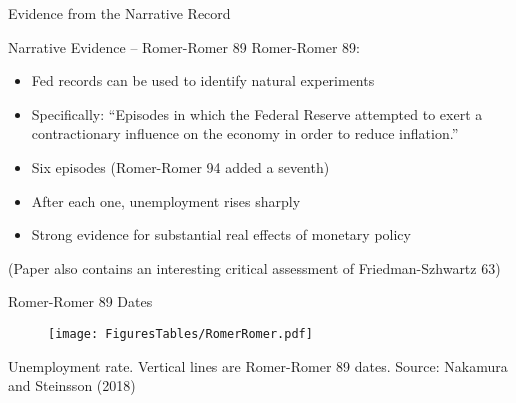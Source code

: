 \documentclass[11pt,aspectratio=169,xcolor={dvipsnames},hyperref={pdftex,pdfpagemode=UseNone,hidelinks,pdfdisplaydoctitle=true},usepdftitle=false]{beamer}
\begin{document}
{  
	\begin{frame}
		\addtocounter{framenumber}{-1}
		\thispagestyle{empty}
		
		\begin{center}
			{\Large Evidence from the Narrative Record}
		\end{center}
		
	\end{frame}
}

\begin{frame}{Narrative Evidence -- Romer-Romer 89}
Romer-Romer 89:
\begin{itemize}
\item Fed records can be used to identify natural experiments
\item Specifically: ``Episodes in which the Federal Reserve attempted to exert a contractionary influence on the economy in order to reduce inflation.''
\item Six episodes (Romer-Romer 94 added a seventh)
\item After each one, unemployment rises sharply
\item Strong evidence for substantial real effects of monetary policy
\end{itemize}

\vspace{20pt}
{\footnotesize (Paper also contains an interesting critical assessment of Friedman-Szhwartz 63)}
\end{frame}


\begin{frame}{Romer-Romer 89 Dates}
\begin{figure}
\centering
\texttt{[image: FiguresTables/RomerRomer.pdf]}
\end{figure}
\vspace{-25pt}
{\scriptsize Unemployment rate. Vertical lines are Romer-Romer 89 dates. Source: Nakamura and Steinsson (2018)}
\end{frame}
\end{document}
